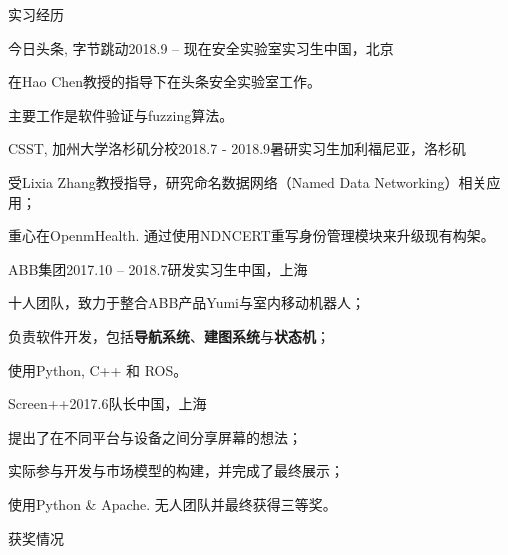 \documentclass{resume} %
\begin{document}
\begin{rSection}{实习经历}

\begin{rSubsection}
  {今日头条, 字节跳动}{2018.9 – 现在}{安全实验室实习生}{中国，北京}
    \item 在Hao Chen教授的指导下在头条安全实验室工作。
    \item 主要工作是软件验证与fuzzing算法。
\end{rSubsection}


\begin{rSubsection}
  {CSST, 加州大学洛杉矶分校}{2018.7 - 2018.9}{暑研实习生}{加利福尼亚，洛杉矶}
    \item 受Lixia Zhang教授指导，研究命名数据网络（Named Data Networking）相关应用；
    \item 重心在OpenmHealth. 通过使用NDNCERT重写身份管理模块来升级现有构架。
\end{rSubsection}


\begin{rSubsection}
  {ABB集团}{2017.10 – 2018.7}{研发实习生}{中国，上海}
    \item 十人团队，致力于整合ABB产品Yumi与室内移动机器人；
    \item 负责软件开发，包括\textbf{导航系统}、\textbf{建图系统}与\textbf{状态机}；
    \item 使用Python, C++ 和 ROS。
\end{rSubsection}


\begin{rSubsection}
  {Screen++}{2017.6}{队长}{中国，上海}
    \item 提出了在不同平台与设备之间分享屏幕的想法；
    \item 实际参与开发与市场模型的构建，并完成了最终展示；
    \item 使用Python \& Apache. 无人团队并最终获得三等奖。
\end{rSubsection}

\end{rSection}

\begin{rSection}{获奖情况}
\end{rSection}
\end{document}
